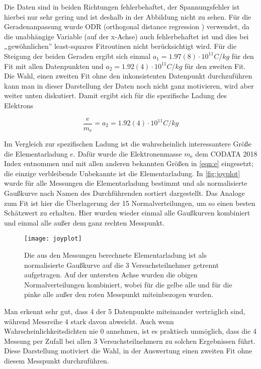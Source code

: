 Die Daten sind in beiden Richtungen fehlerbehaftet, der Spannungsfehler ist hierbei nur sehr gering und ist deshalb in der Abbildung nicht zu sehen. Für die Geradenanpassung wurde ODR (orthogonal distance regression \cite{odr}) verwendet, da die unabhängige Variable (auf der x-Achse) auch fehlerbehaftet ist und dies bei „gewöhnlichen” least-squares Fitroutinen nicht berücksichtigt wird. 
Für die Steigung der beiden Geraden ergibt sich einmal \( a_1 = 1.97(8) \cdot 10^{11} \unit{C/kg} \) für den Fit mit allen Datenpunkten und \( a_2 = 1.92(4) \cdot 10^{11} \unit{C/kg} \) für den zweiten Fit. Die Wahl, einen zweiten Fit ohne den inkonsistenten Datenpunkt durchzuführen kann man in dieser Darstellung der Daten noch nicht ganz motivieren, wird aber weiter unten diskutiert. Damit ergibt sich für die spezifische Ladung des Elektrons 

\begin{equation}
	\frac{e}{m_{\text{e}}} = a_2 = 1.92(4) \cdot 10^{11} \unit{C/kg}
\end{equation}


Im Vergleich zur spezifischen Ladung ist die wahrscheinlich interessantere Größe die Elementarladung \( e \). Dafür wurde die Elektronenmasse \( m_{\text{e}} \) dem CODATA 2018 Index entnommen \cite{codata} und mit allen anderen bekannten Größen in \autoref{eqn:e} eingesetzt; die einzige verbleibende Unbekannte ist die Elementarladung. In \autoref{fig:joyplot} wurde für alle Messungen die Elementarladung bestimmt und  als normalisierte Gaußkurve nach Namen des Durchführenden sortiert dargestellt. Das Analoge zum Fit ist hier die Überlagerung der 15 Normalverteilungen, um so einen besten Schätzwert zu erhalten. Hier wurden wieder einmal alle Gaußkurven kombiniert und einmal alle außer dem ganz rechten Messpunkt. 

\begin{figure}[H]	
	\centering
	\texttt{[image: joyplot]}
	\caption{Die aus den Messungen berechnete Elementarladung ist als normalisierte Gaußkurve auf die 3 Versuchsteilnehmer getrennt aufgetragen. Auf der untersten Achse wurden die obigen Normalverteilungen kombiniert, wobei für die gelbe alle und für die pinke alle außer den roten Messpunkt miteinbezogen wurden.}
	\label{fig:joyplot}
\end{figure}

Man erkennt sehr gut, dass 4 der 5 Datenpunkte miteinander verträglich sind, während Messreihe 4 stark davon abweicht. Auch wenn Wahrscheinlichkeitsdichten nie 0 annehmen, ist es praktisch unmöglich, dass die 4 Messung per Zufall bei allen 3 Versuchsteilnehmern zu solchen Ergebnissen führt. Diese Darstellung motiviert die Wahl, in der Auswertung einen zweiten Fit ohne diesem Messpunkt durchzuführen.

